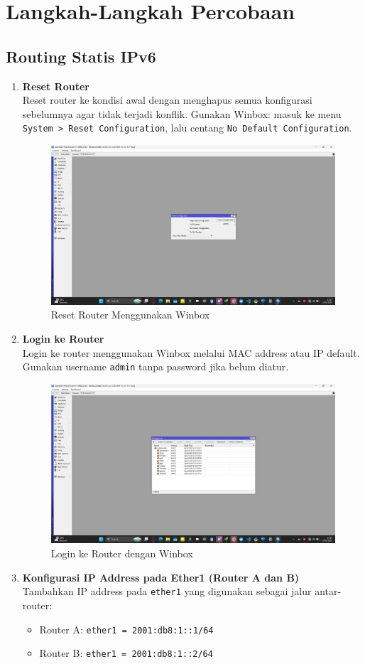\section{Langkah-Langkah Percobaan}
\subsection{Routing Statis IPv6}
\begin{enumerate}
      \item \textbf{Reset Router} \\
    Reset router ke kondisi awal dengan menghapus semua konfigurasi sebelumnya agar tidak terjadi konflik. Gunakan Winbox: masuk ke menu \texttt{System > Reset Configuration}, lalu centang \texttt{No Default Configuration}.

    \begin{figure}[H]
        \centering
        \includegraphics[width=0.5\linewidth]{P2/img/1 (4).jpg}
        \caption{Reset Router Menggunakan Winbox}
        \label{fig:gambar1}
    \end{figure}

    \item \textbf{Login ke Router} \\
    Login ke router menggunakan Winbox melalui MAC address atau IP default. Gunakan username \texttt{admin} tanpa password jika belum diatur.

    \begin{figure}[H]
        \centering
        \includegraphics[width=0.5\linewidth]{P2/img/1 (6).jpg}
        \caption{Login ke Router dengan Winbox}
        \label{fig:gambar2}
    \end{figure}

    \item \textbf{Konfigurasi IP Address pada Ether1 (Router A dan B)} \\
    Tambahkan IP address pada \texttt{ether1} yang digunakan sebagai jalur antar-router:
    \begin{itemize}
        \item Router A: \texttt{ether1 = 2001:db8:1::1/64}
        \item Router B: \texttt{ether1 = 2001:db8:1::2/64}
    \end{itemize}


\end{enumerate}
